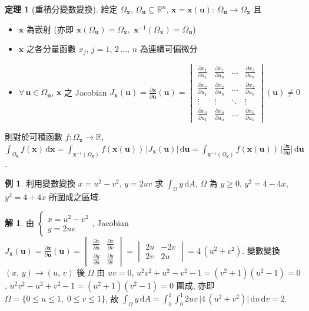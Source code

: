 \documentclass[12pt]{extarticle}
\newcommand{\ds}{\displaystyle}
\theoremstyle{definition}
\newtheorem*{thm}{定理}
\newtheorem*{ex}{例}
\newtheorem*{sol}{解}
\newtheorem*{prf}{證}
\newcommand{\vu}{\mathbf{u}}
\newcommand{\vx}{\mathbf{x}}
\begin{document}
\begin{thm}[重積分變數變換]
  給定 $\Omega_{\vx},\,\Omega_{\vu}\subseteq\mathbb{R}^n$, $\ds\vx = \vx(\vu):\,\Omega_{\vu}\to\Omega_{\vx}$ 且 
  \begin{itemize}
    \item $\vx$ 為嵌射 (亦即 $\ds\vx(\Omega_{\vu}) = \Omega_{\vx},\;\vx^{-1}(\Omega_{\vx}) = \Omega_{\vu}$)
    \item $\vx$ 之各分量函數 $x_j$, $j = 1,\,2\,\ldots,\,n$ 為連續可偏微分
    \item $\forall\,\vu\in\Omega_{\vu}$, $\vx$ 之 Jacobian $\ds J_{\vx}(\vu) = \frac{\partial\vx}{\partial\vu}(\vu) = \begin{vmatrix}\frac{\partial x_1}{\partial u_1} & \frac{\partial x_1}{\partial u_n} & \ldots &\frac{\partial x_1}{\partial u_n} \\ \frac{\partial x_2}{\partial u_1}& \frac{\partial x_2}{\partial u_n} & \ldots &\frac{\partial x_2}{\partial u_n} \\ \vdots & \vdots & \ddots & \vdots \\ \frac{\partial x_n}{\partial u_1} & \frac{\partial x_n}{\partial u_n} & \ldots &\frac{\partial x_n}{\partial u_n} \end{vmatrix}(\vu)\ne 0$
  \end{itemize}
  則對於可積函數 $f:\Omega_{\vx}\to\mathbb{R}$, $\ds\int_{\Omega_{\vx}} f(\vx)\,\text{d}\vx = \int_{\vx^{-1}(\Omega_{\vx})}\!\!\!\!f(\vx(\vu))\,\big|J_{\vx}(\vu)\big|\,\text{d}\vu = \int_{\vx^{-1}(\Omega_{\vx})}\!\!\!\!f(\vx(\vu))\,\bigg|\frac{\partial\vx}{\partial\vu}\bigg|\,\text{d}\vu$.
\end{thm}

%  

\begin{ex}
  利用變數變換 $x = u^2 - v^2$, $y = 2uv$ 求 $\ds\int_\Omega\!y\,\text{d}A$, $\Omega$ 為 $y \geqslant 0$, $y^2 = 4 - 4x$, $y^2 = 4  + 4x$ 所圍成之區域. 
\end{ex}

\begin{sol}
  由 $\ds\begin{cases}x = u^2 - v^2 \\ y = 2uv\end{cases}\!\!\!\!\!$, Jacobian $\ds J_{\vx}(\vu) = \frac{\partial\vx}{\partial\vu}(\vu) = \begin{vmatrix}\frac{\partial x}{\partial u} & \frac{\partial x}{\partial v} \\ \frac{\partial y}{\partial u}& \frac{\partial y}{\partial v}\end{vmatrix} = \begin{vmatrix}2u & -2v\\ 2v & 2u\end{vmatrix} = 4\,(u^2 + v^2)$. 變數變換 $(x,\,y)\to(u,\,v)$ 後 $\Omega$ 由 $uv = 0$, $u^2v^2 + u^2 - v^2 - 1 = (v^2 + 1)(u^2 - 1) = 0$, $u^2v^2 - u^2 + v^2 - 1 = (u^2 + 1)(v^2 - 1) = 0$ 圍成, 亦即 $\Omega = \{0\leqslant u\leqslant 1,\;0\leqslant v\leqslant 1\}$, 故 $\ds\int_\Omega\!y\,\text{d}A = \int_0^1\!\int_0^1 2uv\,\Big|4\,(u^2 + v^2)\Big|\,\text{d}u\,\text{d}v = 2$.
\end{sol}
\end{document}
